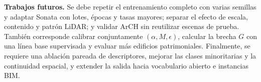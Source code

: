 \noindent\textbf{Trabajos futuros.} Se debe repetir el entrenamiento completo con
varias semillas y adaptar Sonata con lotes, épocas y tasas mayores; separar el efecto
de escala, contenido y patrón LiDAR; y validar ArCH sin reutilizar escenas de prueba.
También corresponde calibrar conjuntamente $(\alpha,M,\epsilon)$, calcular la brecha
$G$ con una línea base supervisada y evaluar más edificios patrimoniales. Finalmente,
se requiere una ablación pareada de descriptores, mejorar las clases minoritarias y la
continuidad espacial, y extender la salida hacia vocabulario abierto e instancias BIM.

\endgroup
